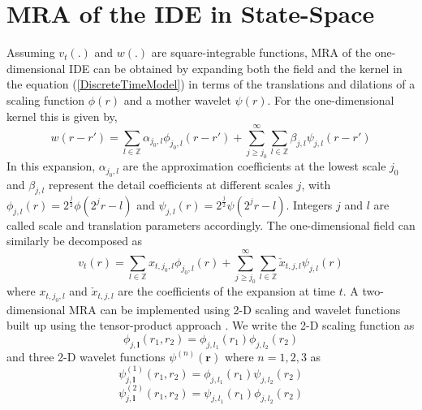 \documentclass[journal,a4paper]{IEEEtran}
\begin{document}
\section{MRA of the IDE in State-Space}
Assuming $v_t(.)$ and $w(.)$ are square-integrable functions, MRA of the one-dimensional IDE can be obtained by expanding  both the field and the kernel in the equation (\ref{DiscreteTimeModel}) in terms of the translations and dilations of a scaling function $\phi(r)$ and a mother wavelet $\psi(r)$. For the one-dimensional kernel this is given by,
\begin{equation}
 w\left(r-r'\right)=\sum_{l \in \mathbb{Z}}\alpha_{j_0,l}\phi_{j_0,l}\left(r-r'\right)+\sum_{j\geq j_0}^{\infty} \sum_{l \in \mathbb{Z}}\beta_{j,l}\psi_{j,l}\left(r-r'\right) 
\label{eq:KernelExpansion}
\end{equation}
In this expansion, $\alpha_{j_0,l}$ are the approximation coefficients at the lowest scale $j_0$ and $ \beta_{j,l}$ represent the detail coefficients at different scales $j$, with $\phi_{j,l}\left(r\right)=2^{\frac{j}{2}}\phi\left(2^jr-l\right) $ and $\psi_{j,l}\left(r\right)=2^{\frac{j}{2}}\psi\left(2^jr-l\right)$. Integers $j$ and $l$ are called scale and translation parameters accordingly. The one-dimensional field can similarly be decomposed as
\begin{equation}
 v_t\left(r\right)=\sum_{l \in \mathbb{Z}}x_{t,j_{0},l}\phi_{j_{0},l}\left(r\right)+\sum_{j\geq j_0}^{\infty} \sum_{l \in \mathbb{Z}} \check{x}_{t,j,l}\psi_{j,l}\left(r\right)
\label{eq:FieldExpansion}
\end{equation}
where $ x_{t,j_{0},l}$ and $\check{x}_{t,j,l} $ are the coefficients of the expansion at time $t$.
A  two-dimensional MRA can be implemented using 2-D scaling and wavelet functions built up  using the tensor-product approach \cite{Meyer1992,Mallat1998}. We write the 2-D scaling function as
\begin{equation}
 \phi_{j,\mathbf{l}}\left(r_1,r_2\right)=\phi_{j,l_1}\left(r_1\right)\phi_{j,l_2}\left(r_2\right)
\label{eq:2Dscalingfunction}
\end{equation}
and three 2-D wavelet functions $ \psi^{(n)} \left(\mathbf{r}\right)$ where $n=1,2,3$ as
\begin{equation}
 \psi_{j,\mathbf{l}}^{(1)}\left(r_1,r_2\right)=\phi_{j,l_1}\left(r_1\right)\psi_{j,l_2}\left(r_2\right)
\label{eq:2Dwavelet_1}
\end{equation}
\begin{equation}
 \psi_{j,\mathbf{l}}^{(2)}\left(r_1,r_2\right)=\psi_{j,l_1}\left(r_1\right)\phi_{j,l_2}\left(r_2\right)
\label{eq:2Dwavelet_2}
\end{equation}
\end{document}
